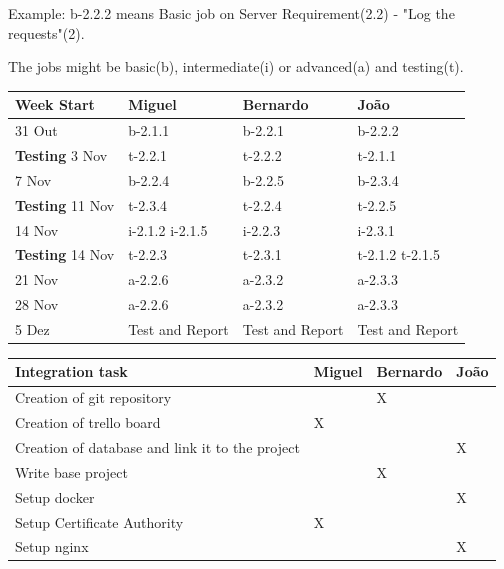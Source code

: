 \documentclass[a4paper,titlepage,11pt]{article}
\begin{document}
Example: b-2.2.2 means Basic job on Server Requirement(2.2) - "Log the requests"(2).

The jobs might be basic(b), intermediate(i) or advanced(a) and testing(t).
\begin{center}
    \begin{tabular}{| l || l | l | l |}
    \hline
    \textbf{Week Start} & \textbf{Miguel} & \textbf{Bernardo} & \textbf{João} \\ \hline \hline
    31 Out & b-2.1.1 & b-2.2.1 & b-2.2.2 \\
    \textbf{Testing} 3 Nov& t-2.2.1 & t-2.2.2 & t-2.1.1 \\ \hline
    7 Nov & b-2.2.4 & b-2.2.5 & b-2.3.4 \\
    \textbf{Testing} 11 Nov & t-2.3.4 & t-2.2.4 & t-2.2.5 \\ \hline
    14 Nov & i-2.1.2 i-2.1.5 & i-2.2.3 & i-2.3.1 \\
    \textbf{Testing} 14 Nov & t-2.2.3 & t-2.3.1 & t-2.1.2 t-2.1.5 \\ \hline
    21 Nov & a-2.2.6 & a-2.3.2 & a-2.3.3 \\
    28 Nov & a-2.2.6 & a-2.3.2 & a-2.3.3 \\
    5 Dez & Test and Report & Test and Report & Test and Report \\ \hline

    \end{tabular}
\end{center}

\begin{center}
    \begin{tabular}{|l| l | l | l |}
    \hline
    \textbf{Integration task} & \textbf{Miguel} & \textbf{Bernardo} & \textbf{João} \\ \hline \hline
    Creation of git repository &  & X &  \\ \hline
    Creation of trello board & X &  &  \\ \hline
    Creation of database and link it to the project &  &  & X \\ \hline
    Write base project &  & X &  \\ \hline
    Setup docker & & & X\\ \hline
    Setup Certificate Authority & X & & \\ \hline
    Setup nginx & & & X \\ \hline
    
    \end{tabular}
\end{center}
\end{document}
